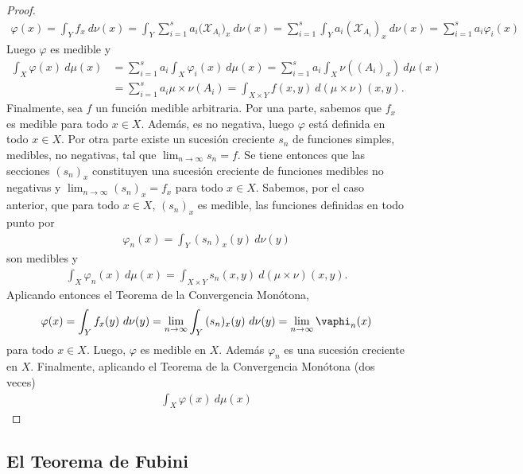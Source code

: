 \begin{proof}
\begin{align*}
    \varphi(x) = \int_{Y}{f_x \ d\nu(x)} = \int_{Y}{\sum_{i=1}^{s}{a_i(\mathcal{X}_{A_i}})_x} \ d\nu(x) = \sum_{i=1}^{s}{\int_{Y}{a_i(\mathcal{X}_{A_i})_x} \ d\nu(x)} = \sum_{i=1}^{s}{a_i\varphi_i(x)}
\end{align*}
Luego $\varphi$ es medible y
\begin{align*}
    \int_{X}{\varphi(x) \ d\mu(x)} &= \sum_{i=1}^{s}{a_i\int_{X}{\varphi_i(x) \ d\mu(x)}} = \sum_{i=1}^{s}{a_i\int_{X}{\nu((A_i)_x) \ d\mu(x)}} \\
    &= \sum_{i=1}^{s}{a_i \mu \times \nu (A_i)} = \int_{X \times Y}{f(x,y) \ d(\mu \times \nu)(x,y)}.
\end{align*}
Finalmente, sea $f$ un función medible arbitraria. Por una parte, sabemos que $f_x$ es medible para todo $x \in X$. Además, es no negativa, luego $\varphi$ está definida en todo $x \in X$. Por otra parte existe un sucesión creciente $s_n$ de funciones simples, medibles, no negativas, tal que $\lim_{n \to \infty}{s_n} = f$. Se tiene entonces que las secciones $(s_n)_x$ constituyen una sucesión creciente de funciones medibles no negativas y $\lim_{n \to \infty}{(s_n)_x} = f_x$ para todo $x \in X$. Sabemos, por el caso anterior, que para todo $x \in X$, $(s_n)_x$ es medible, las funciones definidas en todo punto por
\begin{align*}
    \varphi_n(x) = \int_{Y}{(s_n)_x(y) \ d\nu(y)}
\end{align*}
son medibles y
\begin{align*}
    \int_{X}{\varphi_n(x) \ d\mu(x)} = \int_{X \times Y}{s_n(x,y) \ d(\mu \times \nu)(x,y)}.
\end{align*}
Aplicando entonces el Teorema de la Convergencia Monótona,
\begin{align*}
    \varphi(x) = \int_{Y}{f_x(y) \ d\nu(y)} = \lim_{n \to \infty}{\int_{Y}{(s_n)_x(y) \ d\nu(y)}} = \lim_{n \to \infty}{\vaphi_n(x)}
\end{align*}
para todo $x \in X$. Luego, $\varphi$ es medible en $X$. Además $\varphi_n$ es una sucesión creciente en $X$. Finalmente, aplicando el Teorema de la Convergencia Monótona (dos veces)
\begin{align*}
    \int_{X}{\varphi(x) \ d\mu(x)}
\end{align*}
\end{proof}

\subsection{El Teorema de Fubini}

